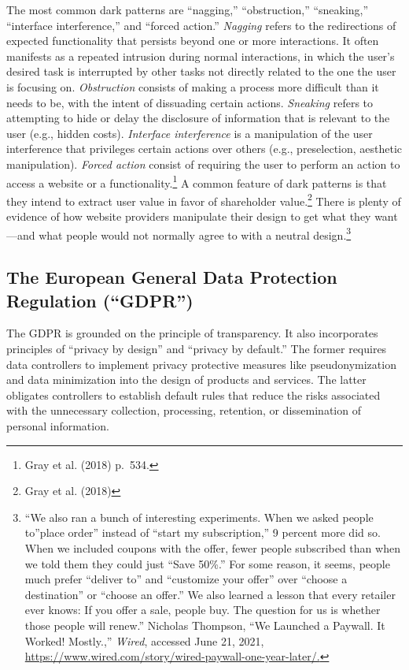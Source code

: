 \documentclass[
  11pt,
  letterpaper,
]{article}
\begin{document}
The most common dark patterns are ``nagging,'' ``obstruction,'' ``sneaking,'' ``interface interference,'' and ``forced action.'' \emph{Nagging} refers to the redirections of expected functionality that persists beyond one or more interactions. It often manifests as a repeated intrusion during normal interactions, in which the user's desired task is interrupted by other tasks not directly related to the one the user is focusing on. \emph{Obstruction} consists of making a process more difficult than it needs to be, with the intent of dissuading certain actions. \emph{Sneaking} refers to attempting to hide or delay the disclosure of information that is relevant to the user (e.g., hidden costs). \emph{Interface interference} is a manipulation of the user interference that privileges certain actions over others (e.g., preselection, aesthetic manipulation). \emph{Forced action} consist of requiring the user to perform an action to access a website or a functionality.\footnote{Gray et al. (2018) p.~534.} A common feature of dark patterns is that they intend to extract user value in favor of shareholder value.\footnote{Gray et al. (2018)} There is plenty of evidence of how website providers manipulate their design to get what they want---and what people would not normally agree to with a neutral design.\footnote{``We also ran a bunch of interesting experiments. When we asked people to''place order'' instead of ``start my subscription,'' 9 percent more did so. When we included coupons with the offer, fewer people subscribed than when we told them they could just ``Save 50\%.'' For some reason, it seems, people much prefer ``deliver to'' and ``customize your offer'' over ``choose a destination'' or ``choose an offer.'' We also learned a lesson that every retailer ever knows: If you offer a sale, people buy. The question for us is whether those people will renew.'' Nicholas Thompson, ``We Launched a Paywall. It Worked! Mostly.,'' \emph{Wired}, accessed June 21, 2021, \url{https://www.wired.com/story/wired-paywall-one-year-later/.}}

\hypertarget{the-european-general-data-protection-regulation-gdpr}{%
\subsection{The European General Data Protection Regulation (``GDPR'')}\label{the-european-general-data-protection-regulation-gdpr}}

The GDPR is grounded on the principle of transparency. It also incorporates principles of ``privacy by design'' and ``privacy by default.'' The former requires data controllers to implement privacy protective measures like pseudonymization and data minimization into the design of products and services. The latter obligates controllers to establish default rules that reduce the risks associated with the unnecessary collection, processing, retention, or dissemination of personal information.
\end{document}
